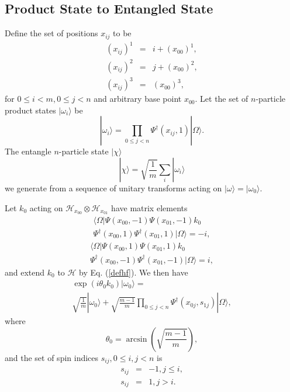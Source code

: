 \documentclass[twocolumn,amsmath,amssymb]{revtex4-1}
\begin{document}
\subsection{\label{app:subsecfirst}Product State to Entangled State}

Define the set of positions $x_{ij}$ to be
\begin{subequations}
\begin{eqnarray}
\label{defxij0}
(x_{ij})^1 & = & i + (x_{00})^1 ,\\
\label{defxij1}
(x_{ij})^2 & = & j + (x_{00})^2,\\
\label{defxij2}
(x_{ij})^3 & = & (x_{00})^3,
\end{eqnarray}
\end{subequations}
for $0 \le i < m, 0 \le j < n$ and arbitrary base point $x_{00}$.
Let the set of $n$-particle product states $|\omega_i \rangle $ be
\begin{equation}
\label{defomega}
|\omega_i \rangle   =  \prod_{0 \le j < n} \Psi^\dagger( x_{ij}, 1) |\Omega \rangle .
\end{equation}
The entangle $n$-particle state $|\chi \rangle $
\begin{equation}
\label{defchi}
|\chi \rangle  = \sqrt{\frac{1}{m}} \sum_i |\omega_i \rangle 
\end{equation}
we generate from a sequence of unitary transforms acting
on $|\omega \rangle  = |\omega_0 \rangle $.



Let $k_{0}$ acting on $\mathcal{H}_{x_{00}} \otimes \mathcal{H}_{x_{01}}$
have matrix elements
\begin{multline}
\label{defk01}
 \langle  \Omega| \Psi( x_{00}, -1) \Psi( x_{01}, -1) k_0  \\
\Psi^{\dagger}(x_{00},1) \Psi^{\dagger}( x_{01},1)|\Omega \rangle  = -i,
\end{multline}
\begin{multline}
\label{defk10}
 \langle  \Omega| \Psi(x_{00},1) \Psi( x_{01}, 1) k_0 
 \\ \Psi^{\dagger}(x_{00},-1) \Psi^{\dagger}( x_{01},-1)|\Omega \rangle  = i,
\end{multline}
and extend $k_0$ to $\mathcal{H}$ by Eq. (\ref{defhf}). 
We then have
\begin{multline}
\label{k00}
\exp( i \theta_0 k_0) |\omega_0 \rangle  = \\
\sqrt{\frac{1}{m}} |\omega_0 \rangle  + 
\sqrt{\frac{m - 1}{m}} \prod_{0 \le j < n} \Psi^{\dagger}( x_{0j}, s_{1j}) |\Omega \rangle ,
\end{multline}
where
\begin{equation}
\label{defarcsin}
\theta_0 = \arcsin( \sqrt{\frac{m - 1}{m}}),
\end{equation}
and the set of spin indices $s_{ij}, 0 \le i,j < n$ is
\begin{subequations}
\begin{eqnarray}
\label{defsj0}
s_{ij} & = & -1, j \le i, \\
\label{defsj1}
s_{ij} & = & 1, j  >  i.
\end{eqnarray}
\end{subequations}
\end{document}
